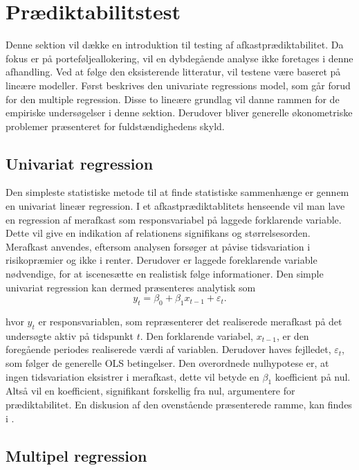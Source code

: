 \documentclass[
  a4paper,
  oneside]{memoir}
\begin{document}
\hypertarget{sekpradik}{%
\section{Prædiktabilitstest}\label{sekpradik}}

Denne sektion vil dække en introduktion til testing af afkastprædiktabilitet. Da fokus er på porteføljeallokering, vil en dybdegående analyse ikke foretages i denne afhandling. Ved at følge den eksisterende litteratur, vil testene være baseret på lineære modeller. Først beskrives den univariate regressions model, som går forud for den multiple regression. Disse to lineære grundlag vil danne rammen for de empiriske undersøgelser i denne sektion. Derudover bliver generelle økonometriske problemer præsenteret for fuldstændighedens skyld.

\hypertarget{univarregr}{%
\subsection{Univariat regression}\label{univarregr}}

Den simpleste statistiske metode til at finde statistiske sammenhænge er gennem en univariat lineær regression. I et afkastprædiktablitets henseende vil man lave en regression af merafkast som responsvariabel på laggede forklarende variable. Dette vil give en indikation af relationens signifikans og størrelsesorden. Merafkast anvendes, eftersom analysen forsøger at påvise tidsvariation i risikopræmier og ikke i renter. Derudover er laggede foreklarende variable nødvendige, for at iscenesætte en realistisk følge informationer. Den simple univariat regression kan dermed præsenteres analytisk som
\[y_t=\beta_0 + \beta_1 x_{t-1} + \varepsilon_t.\]

hvor \(y_t\) er responsvariablen, som repræsenterer det realiserede merafkast på det undersøgte aktiv på tidspunkt \(t\). Den forklarende variabel, \(x_{t-1}\), er den foregående periodes realiserede værdi af variablen. Derudover haves fejlledet, \(\varepsilon_t\), som følger de generelle OLS betingelser. Den overordnede nulhypotese er, at ingen tidsvariation eksistrer i merafkast, dette vil betyde en \(\beta_1\) koefficient på nul. Altså vil en koefficient, signifikant forskellig fra nul, argumentere for prædiktabilitet. En diskusion af den ovenstående præsenterede ramme, kan findes i \citep{Stambaugh1999}.

\hypertarget{multregr}{%
\subsection{Multipel regression}\label{multregr}}
\end{document}
